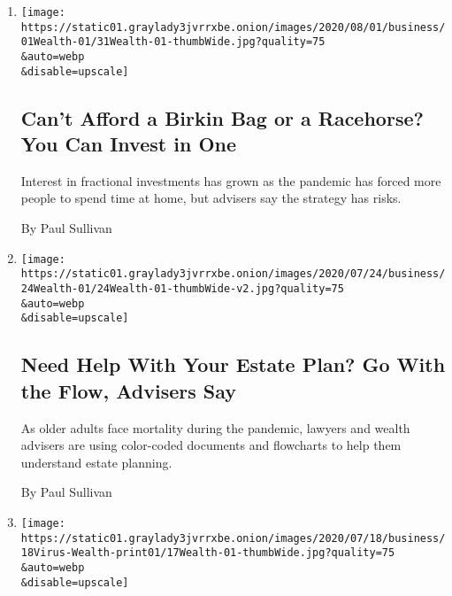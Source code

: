 \begin{enumerate}
\def\labelenumi{\arabic{enumi}.}
\item
  \href{/2020/07/31/your-money/birkin-bag-racehorse-invest.html}{}

  \texttt{[image: https://static01.graylady3jvrrxbe.onion/images/2020/08/01/business/01Wealth-01/31Wealth-01-thumbWide.jpg?quality=75\\\&auto=webp\\\&disable=upscale]}

  \hypertarget{cant-afford-a-birkin-bag-or-a-racehorse-you-can-invest-in-one}{%
  \subsection{Can't Afford a Birkin Bag or a Racehorse? You Can Invest
  in
  One}\label{cant-afford-a-birkin-bag-or-a-racehorse-you-can-invest-in-one}}

  Interest in fractional investments has grown as the pandemic has
  forced more people to spend time at home, but advisers say the
  strategy has risks.

  By Paul Sullivan
\item
  \href{/2020/07/24/your-money/need-help-with-your-estate-plan-go-with-the-flow-advisers-say.html}{}

  \texttt{[image: https://static01.graylady3jvrrxbe.onion/images/2020/07/24/business/24Wealth-01/24Wealth-01-thumbWide-v2.jpg?quality=75\\\&auto=webp\\\&disable=upscale]}

  \hypertarget{need-help-with-your-estate-plan-go-with-the-flow-advisers-say}{%
  \subsection{Need Help With Your Estate Plan? Go With the Flow,
  Advisers
  Say}\label{need-help-with-your-estate-plan-go-with-the-flow-advisers-say}}

  As older adults face mortality during the pandemic, lawyers and wealth
  advisers are using color-coded documents and flowcharts to help them
  understand estate planning.

  By Paul Sullivan
\item
  \href{/2020/07/17/your-money/real-estate-relocation-coronavirus.html}{}

  \texttt{[image: https://static01.graylady3jvrrxbe.onion/images/2020/07/18/business/18Virus-Wealth-print01/17Wealth-01-thumbWide.jpg?quality=75\\\&auto=webp\\\&disable=upscale]}

  \hypertarget{new-tools-for-home-buyers-as-the-pandemic-upends-real-estate}{%
}
\end{enumerate}

